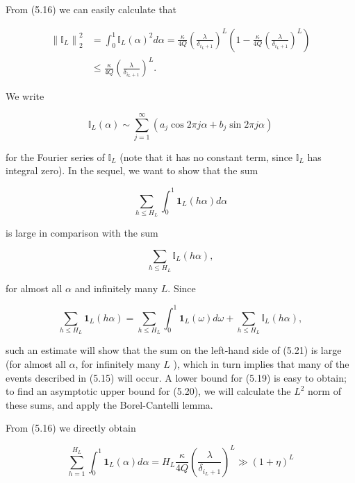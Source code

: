 \documentclass[10pt]{article}
\begin{document}
From (5.16) we can easily calculate that


\begin{align*}
\left\|\mathbb{I}_{L}\right\|_{2}^{2} & =\int_{0}^{1} \mathbb{I}_{L}(\alpha)^{2} d \alpha=\frac{\kappa}{4 Q}\left(\frac{\lambda}{\delta_{i_{L}+1}}\right)^{L}\left(1-\frac{\kappa}{4 Q}\left(\frac{\lambda}{\delta_{i_{L}+1}}\right)^{L}\right) \\
& \leqslant \frac{\kappa}{4 Q}\left(\frac{\lambda}{\delta_{i_{L}+1}}\right)^{L} . \tag{5.18}
\end{align*}


We write

$$
\mathbb{I}_{L}(\alpha) \sim \sum_{j=1}^{\infty}\left(a_{j} \cos 2 \pi j \alpha+b_{j} \sin 2 \pi j \alpha\right)
$$

for the Fourier series of $\mathbb{I}_{L}$ (note that it has no constant term, since $\mathbb{I}_{L}$ has integral zero). In the sequel, we want to show that the sum


\begin{equation*}
\sum_{h \leqslant H_{L}} \int_{0}^{1} \mathbf{1}_{L}(h \alpha) d \alpha \tag{5.19}
\end{equation*}


is large in comparison with the sum


\begin{equation*}
\sum_{h \leqslant H_{L}} \mathbb{I}_{L}(h \alpha), \tag{5.20}
\end{equation*}


for almost all $\alpha$ and infinitely many $L$. Since


\begin{equation*}
\sum_{h \leqslant H_{L}} \mathbf{1}_{L}(h \alpha)=\sum_{h \leqslant H_{L}} \int_{0}^{1} \mathbf{1}_{L}(\omega) d \omega+\sum_{h \leqslant H_{L}} \mathbb{I}_{L}(h \alpha), \tag{5.21}
\end{equation*}


such an estimate will show that the sum on the left-hand side of (5.21) is large (for almost all $\alpha$, for infinitely many $L$ ), which in turn implies that many of the events described in (5.15) will occur. A lower bound for (5.19) is easy to obtain; to find an asymptotic upper bound for (5.20), we will calculate the $L^{2}$ norm of these sums, and apply the Borel-Cantelli lemma.

From (5.16) we directly obtain


\begin{equation*}
\sum_{h=1}^{H_{L}} \int_{0}^{1} \mathbf{1}_{L}(\alpha) d \alpha=H_{L} \frac{\kappa}{4 Q}\left(\frac{\lambda}{\delta_{i_{L}+1}}\right)^{L} \gg(1+\eta)^{L} \tag{5.22}
\end{equation*}
\end{document}
